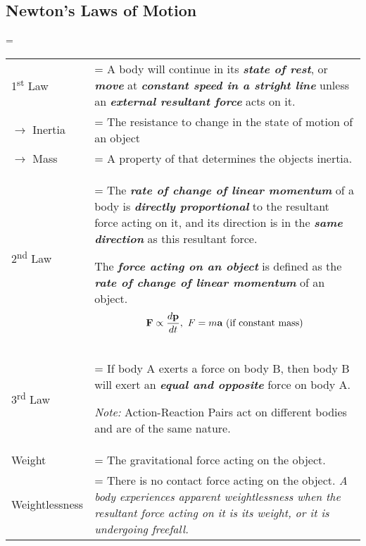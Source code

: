 \documentclass[a4paper]{article}
\newlength{\oldparskip}
\begin{document}
		\subsection{Newton's Laws of Motion}
			\oldparskip=\parskip
			\begin{center}
				\renewcommand{\arraystretch}{1.2}
				\begin{tabular}{@{} l >{\parskip=\oldparskip}p{10.5cm} @{}}
					\toprule
					1\textsuperscript{st} Law & A body will continue in its \textit{\textbf{state of rest}}, or \textbf{\textit{move}} at \textbf{\textit{constant speed in a stright line}} unless an \textbf{\textit{external resultant force}} acts on it.\\
					$\rightarrow$ Inertia & The resistance to change in the state of motion of an object \\
					$\rightarrow$ Mass & A property of that determines the objects inertia. \\
					\midrule
					2\textsuperscript{nd} Law & The \textbf{\textit{rate of change of linear momentum}} of a body is \textbf{\textit{directly proportional}} to the resultant force acting on it, and its direction is in the \textbf{\textit{same direction}} as this resultant force. \par The \textbf{\textit{force acting on an object}} is defined as the \textbf{\textit{rate of change of linear momentum}} of an object. $$\textbf{F} \propto \frac{d\textbf{p}}{dt}, ~F=m\textbf{a} \textrm{ (if constant mass)} \vspace*{-\baselineskip}$$ \\
					\midrule
					3\textsuperscript{rd} Law & If body A exerts a force on body B, then body B will exert an \textbf{\textit{equal and opposite}} force on body A. \par \textit{Note:} Action-Reaction Pairs act on different bodies and are of the same nature.\\
					\midrule
					Weight & The gravitational force acting on the object. \\
					Weightlessness & There is no contact force acting on the object. \textit{A body experiences apparent weightlessness when the resultant force acting on it is its weight, or it is undergoing freefall.} \\
					\bottomrule
				\end{tabular}
			\end{center}
\end{document}
